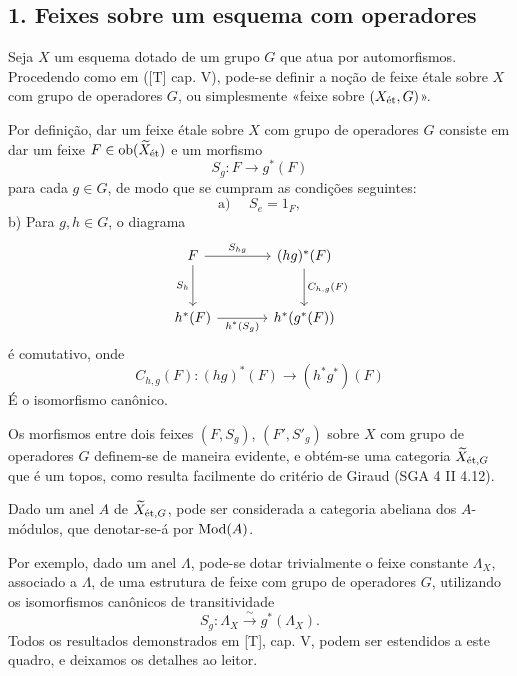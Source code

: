 \subsection*{1. Feixes sobre um esquema com operadores}

Seja $X$ um esquema dotado de um grupo $G$ que atua por automorfismos. Procedendo como em ([T] cap. V), pode-se definir a noção de feixe étale sobre $X$ com grupo de operadores $G$, ou simplesmente «feixe sobre $(X_{\mathrm{\acute{e}t}},G)$».

Por definição, dar um feixe étale sobre $X$ com grupo de operadores $G$ consiste em dar um feixe $F\in \operatorname{ob}(\widetilde X_{\mathrm{\acute{e}t}})$ e um morfismo
\[
S_g:F\longrightarrow g^*(F)
\]
para cada $g\in G$, de modo que se cumpram as condições seguintes:
\[
\text{a) }\quad S_e=1_F,
\]
b) Para $g,h\in G$, o diagrama
\[
\begin{tikzcd}[column sep=large,row sep=large]
F \arrow[r,"S_{hg}"] \arrow[d,"S_h"'] & (hg)^*(F) \arrow[d,"C_{h,g}(F)"]\\
h^*(F) \arrow[r,"h^*(S_g)"'] & h^*(g^*(F))
\end{tikzcd}
\]
é comutativo, onde
\[
C_{h,g}(F):(hg)^*(F)\longrightarrow (h^*g^*)(F)
\]
É o isomorfismo canônico.

Os morfismos entre dois feixes $(F,S_g)$, $(F',S'_g)$ sobre $X$ com grupo de operadores $G$ definem-se de maneira evidente, e obtém-se uma categoria $\widetilde X_{\mathrm{\acute{e}t},G}$ que é um topos, como resulta facilmente do critério de Giraud (SGA 4 II 4.12).

Dado um anel $A$ de $\widetilde X_{\mathrm{\acute{e}t},G}$, pode ser considerada a categoria abeliana dos $A$-módulos, que denotar-se-á por $\operatorname{Mod}(A)$.

Por exemplo, dado um anel $\Lambda$, pode-se dotar trivialmente o feixe constante $\Lambda_X$, associado a $\Lambda$, de uma estrutura de feixe com grupo de operadores $G$, utilizando os isomorfismos canônicos de transitividade
\[
S_g:\Lambda_X\xrightarrow{\sim}g^*(\Lambda_X).
\]
Todos os resultados demonstrados em [T], cap. V, podem ser estendidos a este quadro, e deixamos os detalhes ao leitor.
